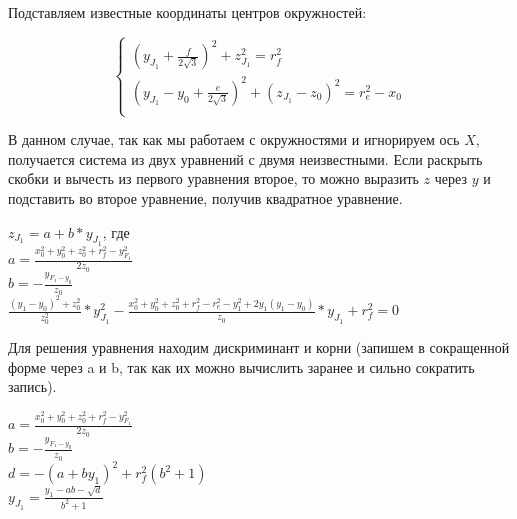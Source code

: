 Подставляем известные координаты центров окружностей:


\begin{equation*}
    \begin{cases}
        (y_{J_{1}} + \frac{f}{2\sqrt{3}})^{2} + z^{2}_{J_{1}} = r^{2}_{f}\\
        (y_{J_{1}} -y_{0} +\frac{e}{2\sqrt{3}})^{2} +(z_{J_{1}} -z_{0})^{2} = r^{2}_{e}-x_{0}\\
    \end{cases}
\end{equation*}

 В данном случае, так как мы работаем с окружностями и игнорируем ось $X$, получается система из двух уравнений с двумя неизвестными. Если раскрыть скобки и вычесть из первого уравнения второе, то можно выразить $z$ через $y$ и подставить во второе уравнение, получив квадратное уравнение.

\begin{center}
\vspace{0.75cm}
$z_{J_{1}} = a + b*y_{J_{1}}$, где\\
\vspace{0.5cm}
$ a = \frac{x^{2}_{0}+y^{2}_{0}+z^{2}_{0}+r^{2}_{f}-y^{2}_{F_{1}}}{2z_{0}} $\\

\vspace{0.5cm}
$ b = -\frac{y_{F_{1} - y_{0}}} {z_{0}} $\\
\vspace{0.5cm}
$\frac{(y_{1} - y_{0})^{2} + z^{2}_{0}}{z^{2}_{0}}*y^{2}_{J_{1}} - \frac{x_{0}^{2} + y_{0}^{2} + z_{0}^{2} + r_{f}^{2} - r_{e}^{2} -y_{1}^{2} + 2y_{1}(y_{1} - y_{0})}{z_{0}}*y_{J_{1}} + r^{2}_{f} = 0  $\\

\end{center}

Для решения уравнения находим дискриминант и корни (запишем в сокращенной форме через a и  b, так как их можно вычислить заранее и сильно сократить запись).

\begin{center}
    $ a = \frac{x^{2}_{0}+y^{2}_{0}+z^{2}_{0}+r^{2}_{f}-y^{2}_{F_{1}}}{2z_{0}} $\\
\vspace{0.5cm}
    $ b = -\frac{y_{F_{1} - y_{0}}} {z_{0}} $\\
\vspace{0.5cm}
$ d = -(a+by_{1})^{2} + r_{f}^{2}(b^{2} + 1) $\\
\vspace{0.5cm}
$y_{J_{1}} = \frac{ y_{1} -ab -\sqrt{d} } {b^{2} +1}$
\end{center}

